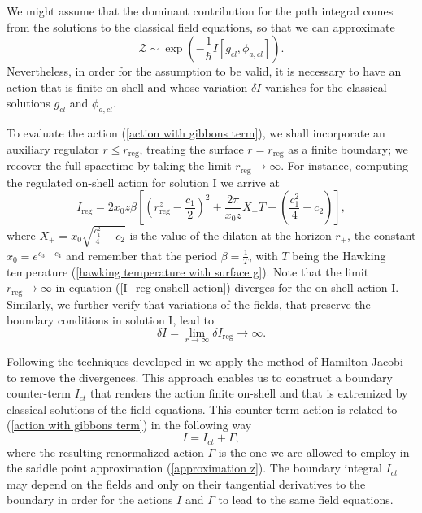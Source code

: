 \documentclass[sn-mathphys,Numbered]{sn-jnl}%
\theoremstyle{thmstyleone}%
\theoremstyle{thmstyletwo}%
\theoremstyle{thmstylethree}%
\begin{document}
We might assume that the dominant contribution for the path integral comes from the solutions to the classical field equations, so that we can approximate 
%
\begin{equation} \label{approximation z}
\mathcal{Z} \sim \exp \left(-\frac{1}{\hbar} I\left[g_{c l}, \phi_{a,c l}\right]\right).
\end{equation}
%
 Nevertheless, in order for the assumption to be valid, it is necessary to have an action that is finite on-shell and whose variation $\delta I$ vanishes for the classical solutions $g_{cl}$ and $\phi_{a,cl}$. 
 
 To evaluate the action (\ref{action with gibbons term}), we shall incorporate an auxiliary regulator $r\leq r_{\text{reg}}$, treating the surface $r=r_{\text{reg}}$ as a finite boundary; we recover the full spacetime by taking the limit $r_{\text{reg}} \rightarrow \infty$. For instance, computing the regulated on-shell action for solution I we arrive at
\begin{equation} \label{I_reg onshell action}
    I_{\text{reg}}=2x_0 z \beta \left[\left(r_{\text{reg}}^z-\frac{c_1}{2}\right)^2+\frac{2\pi}{x_0 z} X_+ T-\left(\frac{c_1^2}{4}-c_2\right)\right],
\end{equation}
%
where $X_+=x_0 \sqrt{\frac{c_1^2}{4}-c_2}$ is the value of the dilaton at the horizon $r_+$, the constant $x_0=e^{c_3+c_4}$ and remember that the period $\beta=\frac{1}{T}$, with $T$ being the Hawking temperature (\ref{hawking temperature with surface g}). Note that the limit $r_{\text{reg}}\to\infty$ in equation (\ref{I_reg onshell action})
diverges for the on-shell action I. Similarly, we further verify that variations of the fields, that preserve the boundary conditions in solution I, lead to 
%
\begin{equation}
    \delta I=\lim_{r \rightarrow \infty} \delta I_{\text{reg}}\rightarrow \infty.
\end{equation}

 
Following the techniques developed in \cite{Davis,Grumiller} we apply the method of Hamilton-Jacobi \cite{Martelli} to remove the divergences. This approach enables us to construct a boundary counter-term  $I_{ct}$ that renders the action finite on-shell and that is extremized  by classical solutions of the field equations. This counter-term action is related to (\ref{action with gibbons term}) in the following way
%
\begin{equation} \label{relation actions}
    I= I_{ct}+ \Gamma,
\end{equation}
where the resulting renormalized action $\Gamma$ is the one we are allowed to employ in the saddle point approximation (\ref{approximation z}). The boundary integral $I_{ct}$ may depend on the fields and only on their tangential derivatives to the boundary in order for the actions $I$ and $\Gamma$ to lead to the same field equations. 
\end{document}
